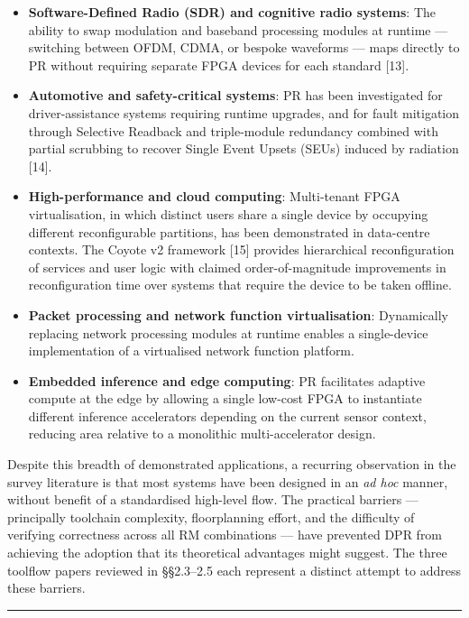 \begin{itemize}
  \item \textbf{Software-Defined Radio (SDR) and cognitive radio systems}: The ability to swap modulation and baseband processing modules at runtime — switching between OFDM, CDMA, or bespoke waveforms — maps directly to PR without requiring separate FPGA devices for each standard [13].
  \item \textbf{Automotive and safety-critical systems}: PR has been investigated for driver-assistance systems requiring runtime upgrades, and for fault mitigation through Selective Readback and triple-module redundancy combined with partial scrubbing to recover Single Event Upsets (SEUs) induced by radiation [14].
  \item \textbf{High-performance and cloud computing}: Multi-tenant FPGA virtualisation, in which distinct users share a single device by occupying different reconfigurable partitions, has been demonstrated in data-centre contexts. The Coyote v2 framework [15] provides hierarchical reconfiguration of services and user logic with claimed order-of-magnitude improvements in reconfiguration time over systems that require the device to be taken offline.
  \item \textbf{Packet processing and network function virtualisation}: Dynamically replacing network processing modules at runtime enables a single-device implementation of a virtualised network function platform.
  \item \textbf{Embedded inference and edge computing}: PR facilitates adaptive compute at the edge by allowing a single low-cost FPGA to instantiate different inference accelerators depending on the current sensor context, reducing area relative to a monolithic multi-accelerator design.
\end{itemize}
Despite this breadth of demonstrated applications, a recurring observation in the survey literature is that most systems have been designed in an \textit{ad hoc} manner, without benefit of a standardised high-level flow. The practical barriers — principally toolchain complexity, floorplanning effort, and the difficulty of verifying correctness across all RM combinations — have prevented DPR from achieving the adoption that its theoretical advantages might suggest. The three toolflow papers reviewed in §§2.3–2.5 each represent a distinct attempt to address these barriers.

\vspace{0.4em}\hrule\vspace{0.4em}

